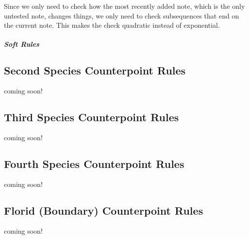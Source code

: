 \begin{enumerate}
					Since we only need to check how the most recently added note, which is the only untested note, changes things, we only need to check subsequences that end on the current note.
					This makes the check quadratic instead of exponential.
	\end{enumerate}
\subparagraph{Soft Rules}

\subsection{Second Species Counterpoint Rules}
coming soon!
\subsection{Third Species Counterpoint Rules}
coming soon!
\subsection{Fourth Species Counterpoint Rules}
coming soon!
\subsection{Florid (Boundary) Counterpoint Rules}
coming soon!

